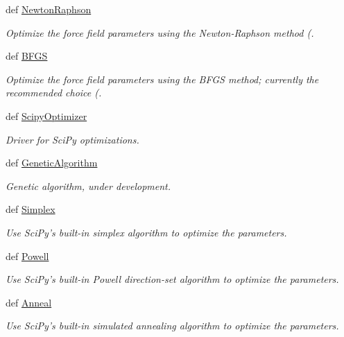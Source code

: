 \begin{DoxyCompactItemize}
def \hyperlink{classforcebalance_1_1optimizer_1_1Optimizer_a5b6e95f9f49b7d970ac8441d68a0023f}{Newton\-Raphson}
\begin{DoxyCompactList}\small\item\em Optimize the force field parameters using the Newton-\/\-Raphson method (. \end{DoxyCompactList}\item 
def \hyperlink{classforcebalance_1_1optimizer_1_1Optimizer_a58b957fe289822934711c29dfeb8d203}{B\-F\-G\-S}
\begin{DoxyCompactList}\small\item\em Optimize the force field parameters using the B\-F\-G\-S method; currently the recommended choice (. \end{DoxyCompactList}\item 
def \hyperlink{classforcebalance_1_1optimizer_1_1Optimizer_a503e87533bd9c257cb9c4b505af9c1de}{Scipy\-Optimizer}
\begin{DoxyCompactList}\small\item\em Driver for Sci\-Py optimizations. \end{DoxyCompactList}\item 
def \hyperlink{classforcebalance_1_1optimizer_1_1Optimizer_a50ffc779fbba5a99085cba45d868fc29}{Genetic\-Algorithm}
\begin{DoxyCompactList}\small\item\em Genetic algorithm, under development. \end{DoxyCompactList}\item 
def \hyperlink{classforcebalance_1_1optimizer_1_1Optimizer_a6b3af8115718f61a6a21c3297d717ead}{Simplex}
\begin{DoxyCompactList}\small\item\em Use Sci\-Py's built-\/in simplex algorithm to optimize the parameters. \end{DoxyCompactList}\item 
def \hyperlink{classforcebalance_1_1optimizer_1_1Optimizer_a0745b2e3607ef308ba48bb1d34e5be79}{Powell}
\begin{DoxyCompactList}\small\item\em Use Sci\-Py's built-\/in Powell direction-\/set algorithm to optimize the parameters. \end{DoxyCompactList}\item 
def \hyperlink{classforcebalance_1_1optimizer_1_1Optimizer_a183911848e43ca0be1893b87290dc31e}{Anneal}
\begin{DoxyCompactList}\small\item\em Use Sci\-Py's built-\/in simulated annealing algorithm to optimize the parameters. \end{DoxyCompactList}\item 

\end{DoxyCompactItemize}

